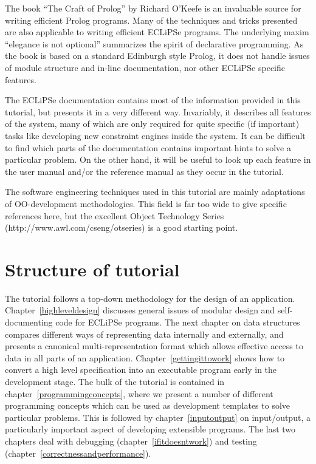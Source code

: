\documentclass[a4paper,12pt]{report}
\begin{document}
The book ``The Craft of Prolog'' by Richard O'Keefe is an invaluable source for writing efficient Prolog programs. Many of the techniques and tricks presented are also applicable to writing efficient ECLiPSe programs. The underlying maxim ``elegance is not optional'' summarizes the spirit of declarative programming. As the book is based on a standard Edinburgh style Prolog, it does not handle issues of module structure and in-line documentation, nor other ECLiPSe specific features.

The ECLiPSe documentation contains most of the information provided in this tutorial, but presents it in a very different way. Invariably, it describes all features of the system, many of which are only required for quite specific (if important) tasks like developing new constraint engines inside the system. It can be difficult to find which parts of the documentation contains important hints to solve a particular problem. On the other hand, it will be useful to look up each feature in the user manual and/or the reference manual as they occur in the tutorial.

The software engineering techniques used in this tutorial are mainly adaptations of OO-development methodologies. This field is far too wide to give specific references here, but the excellent Object Technology Series (http://www.awl.com/cseng/otseries) is a good starting point.

\section{Structure of tutorial}
The tutorial follows a top-down methodology for the design of an application. Chapter~\ref{highleveldesign} discusses general issues of modular design and self-documenting code for ECLiPSe programs. The next chapter on data structures compares different ways of representing data internally and externally, and presents a canonical multi-representation format which allows effective access to data in all parts of an application. Chapter~\ref{gettingittowork} shows how to convert a high level specification into an executable program early in the development stage. The bulk of the tutorial is contained in chapter~\ref{programmingconcepts}, where we present a number of different programming concepts which can be used as development templates to solve particular problems. This is followed by chapter~\ref{inputoutput} on input/output, a particularly important aspect of developing extensible programs. The last two chapters deal with debugging (chapter~\ref{ifitdoesntwork}) and testing (chapter~\ref{correctnessandperformance}).
\end{document}
